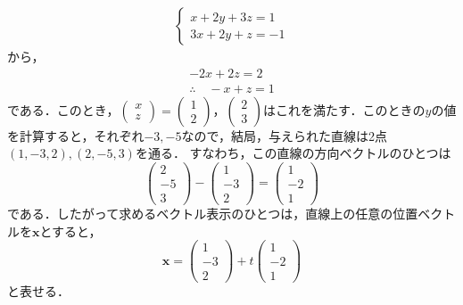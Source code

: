 \documentclass[a4paper,10pt,fleqn]{ltjsarticle}
\begin{document}
\begin{tleftbar}
  \begin{align*}
    \begin{cases}
      x+2y+3z=1 \\
      3x+2y+z=-1
    \end{cases}
  \end{align*}
  から，
  \begin{gather*}
    -2x+2z=2 \\
    \therefore \quad -x+z=1
  \end{gather*}
  である．このとき，$
    \begin{pmatrix}
      x \\
      z
    \end{pmatrix}
    =
    \begin{pmatrix}
      1 \\
      2
    \end{pmatrix}
    ，
    \begin{pmatrix}
      2 \\
      3
    \end{pmatrix}
  $はこれを満たす．このときの$y$の値を計算すると，それぞれ$-3,-5$なので，結局，与えられた直線は2点$(1,-3,2),(2,-5,3)$を通る．
  すなわち，この直線の方向ベクトルのひとつは
  \[
    \begin{pmatrix}
      2  \\
      -5 \\
      3
    \end{pmatrix}
    -
    \begin{pmatrix}
      1  \\
      -3 \\
      2
    \end{pmatrix}
    =
    \begin{pmatrix}
      1  \\
      -2 \\
      1
    \end{pmatrix}
  \]
  である．したがって求めるベクトル表示のひとつは，直線上の任意の位置ベクトルを$\bm{x}$とすると，
  \[
    \bm{x} =
    \begin{pmatrix}
      1  \\
      -3 \\
      2
    \end{pmatrix}
    +t
    \begin{pmatrix}
      1  \\
      -2 \\
      1
    \end{pmatrix}
  \]
  と表せる．
\end{tleftbar}
\end{document}
